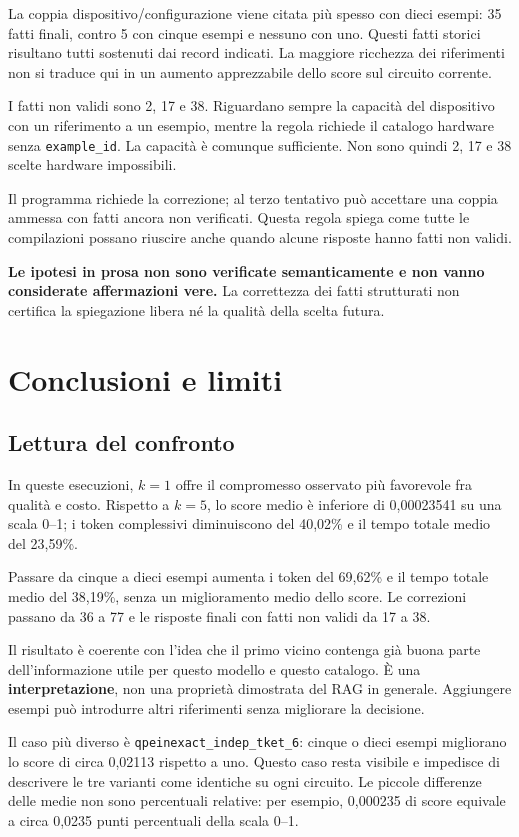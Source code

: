 \documentclass[a4paper,10pt]{article}
\begin{document}
La coppia dispositivo/configurazione viene citata più spesso con dieci
esempi: 35 fatti finali, contro 5 con cinque esempi e nessuno con uno.
Questi fatti storici risultano tutti sostenuti dai record indicati.
La maggiore ricchezza dei riferimenti non si traduce qui in un aumento
apprezzabile dello score sul circuito corrente.

I fatti non validi sono 2, 17 e 38. Riguardano sempre la capacità del dispositivo
con un riferimento a un esempio, mentre la regola richiede il catalogo hardware
senza \texttt{example\_id}. La capacità è comunque sufficiente.
Non sono quindi 2, 17 e 38 scelte hardware impossibili.

Il programma richiede la correzione; al terzo tentativo può accettare una coppia
ammessa con fatti ancora non verificati. Questa regola spiega come tutte le
compilazioni possano riuscire anche quando alcune risposte hanno fatti non validi.

\textbf{Le ipotesi in prosa non sono verificate semanticamente e non vanno
considerate affermazioni vere.} La correttezza dei fatti strutturati non
certifica la spiegazione libera né la qualità della scelta futura.

\clearpage\section{Conclusioni e limiti}
\subsection{Lettura del confronto}
In queste esecuzioni, $k=1$ offre il compromesso osservato più favorevole fra qualità e costo. Rispetto a $k=5$, lo score medio è inferiore di 0,00023541 su una scala 0--1; i token complessivi diminuiscono del 40,02\% e il tempo totale medio del 23,59\%.\par
Passare da cinque a dieci esempi aumenta i token del 69,62\% e il tempo totale medio del 38,19\%, senza un miglioramento medio dello score. Le correzioni passano da 36 a 77 e le risposte finali con fatti non validi da 17 a 38.\par
Il risultato è coerente con l'idea che il primo vicino contenga già buona
parte dell'informazione utile per questo modello e questo catalogo. È una
\textbf{interpretazione}, non una proprietà dimostrata del RAG in generale.
Aggiungere esempi può introdurre altri riferimenti senza migliorare la decisione.

Il caso più diverso è \nolinkurl{qpeinexact_indep_tket_6}: cinque o dieci esempi
migliorano lo score di circa 0,02113 rispetto a uno. Questo caso resta visibile
e impedisce di descrivere le tre varianti come identiche su ogni circuito.
Le piccole differenze delle medie non sono percentuali relative: per esempio,
0,000235 di score equivale a circa 0,0235 punti percentuali della scala 0--1.
\end{document}
